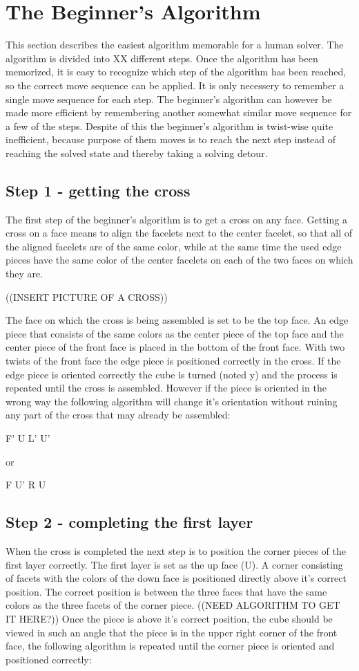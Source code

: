 
\label{sec:beginner}

\section{The Beginner's Algorithm}
This section describes the easiest algorithm memorable for a human solver. The algorithm is divided into XX different steps. Once the algorithm has been memorized, it is easy to recognize which step of the algorithm has been reached, so the correct move sequence can be applied. It is only necessery to remember a single move sequence for each step. The beginner's algorithm can however be made more efficient by remembering another somewhat similar move sequence for a few of the steps. Despite of this the beginner's algorithm is twist-wise quite inefficient, because purpose of them moves is to reach the next step instead of reaching the solved state and thereby taking a solving detour. 

\subsection{Step 1 - getting the cross}
The first step of the beginner's algorithm is to get a cross on any face. Getting a cross on a face means to align the facelets next to the center facelet, so that all of the aligned facelets are of the same color, while at the same time the used edge pieces have the same color of the center facelets on each of the two faces on which they are.

((INSERT PICTURE OF A CROSS))

The face on which the cross is being assembled is set to be the top face. An edge piece that consists of the same colors as the center piece of the top face and the center piece of the front face is placed in the bottom of the front face. With two twists of the front face the edge piece is positioned correctly in the cross. If the edge piece is oriented correctly the cube is turned (noted y) and the process is repeated until the cross is assembled. However if the piece is oriented in the wrong way the following algorithm will change it's orientation without ruining any part of the cross that may already be assembled:

F' U L' U'

or

F U' R U

\subsection{Step 2 - completing the first layer}
When the cross is completed the next step is to position the corner pieces of the first layer correctly. The first layer is set as the up face (U). A corner consisting of facets with the colors of the down face is positioned directly above it's correct  position. The correct position is between the three faces that have the same colors as the three facets of the corner piece. ((NEED ALGORITHM TO GET IT HERE?)) Once the piece is above it's correct position, the cube should be viewed in such an angle that the piece is in the upper right corner of the front face, the following algorithm is repeated until the corner piece is oriented and positioned correctly:

